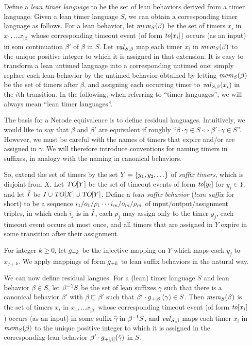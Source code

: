Define a {\em lean timer language} to be the set of lean behaviors derived from
a timer language. Given a lean timer language $S$, we can obtain a corresponding
timer language as follows. For a lean behavior, 
let $\mathit{mem}_{S}(\beta)$ be the set of timers $x_i$ in
$x_1 , \ldots x_{|\beta|}$ whose corresponding timeout event
(of form $\mathit{to}[x_i]$) occurs (as an input) in som continuation $\beta'$
of $\beta$ in $S$.
Let $\mathit{val}_{S,\beta}$ map each timer $x_i$ in
$\mathit{mem}_{S}(\beta)$ to the unique positive integer to which it
is assigned in that extension.
It is easy to transform a lean untimed language into a corresponding untimed one:
simply replace each lean behavior by the untimed behavior obtained by
letting $\mathit{mem}_{S}(\beta)$ be the set of timers after $\beta$,
and assigning each occurring timer to 
$\mathit{val}_{S,\beta}(x_i)$ in the $i$th transition.
In the following, when referring to ``timer languages'', we will always
mean ``lean timer languages''.

The basis for a Nerode equivalence is to define residual languages.
Intuitively, we would like to say that $\beta$ and $\beta'$ are equivalent if
roughly
``$\beta \cdot \gamma \in S \iff \beta' \cdot \gamma \in S$''. However, we must
be careful with the names of timers that expire and/or are assigned in $\gamma$.
We will therefore introduce conventions for naming timers in suffixes, in
analogy with the naming in canonical behaviors.

So, extend the set of timers by the set $Y = \lbrace y_1,y_2,\ldots\rbrace$ of
{\em suffix timers}, which is disjoint from $X$.
Let $\mbox{\sl TO}[Y]$ be the set of timeout events of form
$\mathit{to}[y_i]$ for $y_i \in Y$, and let
$\tilde{I}$ be $I \cup \mbox{\sl TO}[X] \cup \mbox{\sl TO}[Y]$.
Define a {\em lean suffix behavior} ({\em lean suffix} for short)
to be a sequence
$i_1/o_1/\rho_1 \cdots i_m/o_m/\rho_m$ of input/output/assignment triples,
in which each $i_j$ is in $\tilde{I}$, 
each $\rho_j$ may assign only to the timer $y_j$,
each timeout event occurs at most once,
and all timers that are assigned in $Y$ expire in some transition
after their assignment.

For integer $k \geq 0$, let $g_{+{k}}$ be the injective mapping on
$Y$ which maps each $y_j$ to $x_{j+k}$.  We apply mappings of form
$g_{+{k}}$ to lean suffix behaviors in the natural way.

We can now define residual langues. For a (lean) timer language $S$ and lean
behavior $\beta \in S$, let
${\beta}^{-1}{S}$ be the set of lean suffixes $\gamma$ such that
there is a canonical behavior $\beta'$ with $\beta \sqsubseteq \beta'$ such that
$\beta'\cdot g_{+{|\beta|}}(\gamma) \in S$.
Then $\mathit{mem}_{S}(\beta)$ is the set of timers $x_i$ in
$x_1 , \ldots x_{|\beta|}$ whose corresponding timeout event
(of form $\mathit{to}[x_i]$) occurs (as an input) in some suffix $\hat{\gamma}$ in
${\beta}^{-1}{S}$, and
$\mathit{val}_{S,\beta}$ maps each timer $x_i$ in
$\mathit{mem}_{S}(\beta)$ to the unique positive integer to which it
is assigned in the corresponding
lean behavior $\beta'\cdot g_{+{|\beta|}}(\hat{\gamma})$
in $S$.

